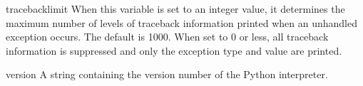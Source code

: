 \begin{datadesc}{tracebacklimit}
When this variable is set to an integer value, it determines the
maximum number of levels of traceback information printed when an
unhandled exception occurs.  The default is 1000.  When set to 0 or
less, all traceback information is suppressed and only the exception
type and value are printed.
\end{datadesc}

\begin{datadesc}{version}
A string containing the version number of the Python interpreter.  
\end{datadesc}
